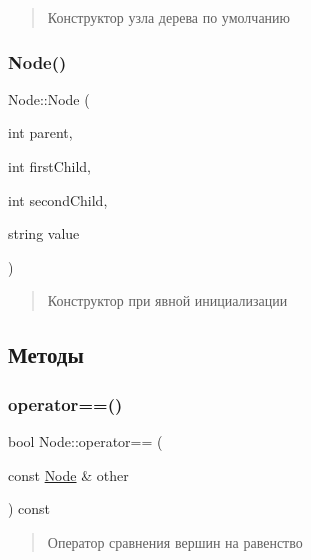 \begin{quote}
Конструктор узла дерева по умолчанию \end{quote}


\mbox{\label{struct_node_a314c4afdba9c757f65d45f236a9ce1fe}} 
\subsubsection{\texorpdfstring{Node()}{Node()}\hspace{0.1cm}{\footnotesize\ttfamily [2/2]}}
{\footnotesize\ttfamily Node\+::\+Node (\begin{DoxyParamCaption}\item[{int}]{parent,  }\item[{int}]{first\+Child,  }\item[{int}]{second\+Child,  }\item[{string}]{value }\end{DoxyParamCaption})\hspace{0.3cm}{\ttfamily [inline]}}



\begin{quote}
Конструктор при явной инициализации \end{quote}




\subsection{Методы}
\mbox{\label{struct_node_a0e28753e22ef956f881210795f1c102f}} 
\subsubsection{\texorpdfstring{operator==()}{operator==()}}
{\footnotesize\ttfamily bool Node\+::operator== (\begin{DoxyParamCaption}\item[{const \mbox{\hyperlink{struct_node}{Node}} \&}]{other }\end{DoxyParamCaption}) const\hspace{0.3cm}{\ttfamily [inline]}}



\begin{quote}
Оператор сравнения вершин на равенство \end{quote}




